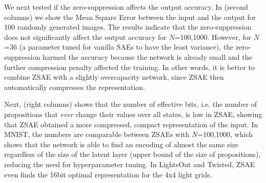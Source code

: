 We next tested if the zero-suppression affects the output accuracy.
In  (second columns)
we show the Mean Square Error between the input and the output
for 100 randomly generated images.
The results indicate that the zero-suppression does not significantly affect the output accuracy for $N$=100,1000.
However, for $N$=36 (a parameter tuned for vanilla SAEs to have the least variance), the zero-suppression
harmed the accuracy because the network is already small and the further compression penalty affected the training.
In other words, it is better to combine ZSAE with a slightly overcapacity network,
since ZSAE then automatically compresses the representation.

Next,  (right columns) shows that the number of effective bits,
i.e. the number of propositions that \emph{ever} change their values over all states, is low in ZSAE, showing that
ZSAE obtained a more compressed, compact representation of the input.
In MNIST, the numbers are comparable between ZSAEs with $N$=100,1000,
which shows that the network is able to find an encoding of almost the same size
regardless of the size of the latent layer (upper bound of the size of
propositions), reducing the need for hyperparameter tuning.
In LightsOut and Twisted, ZSAE even finds the 16bit optimal representation for the 4x4 light grids.


